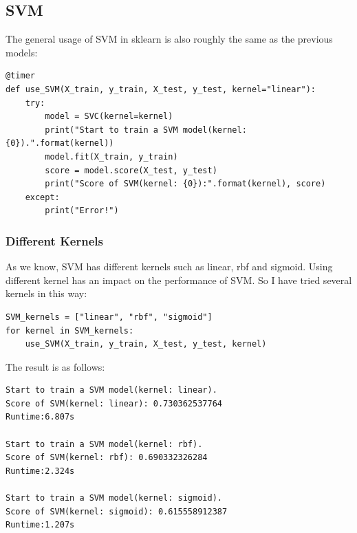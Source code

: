 \documentclass[a4paper]{article}
\begin{document}
        \subsection{SVM}
The general usage of SVM in sklearn is also roughly the same as the previous models:
\begin{verbatim}
@timer
def use_SVM(X_train, y_train, X_test, y_test, kernel="linear"):
    try:
        model = SVC(kernel=kernel)
        print("Start to train a SVM model(kernel: {0}).".format(kernel))
        model.fit(X_train, y_train)
        score = model.score(X_test, y_test)
        print("Score of SVM(kernel: {0}):".format(kernel), score)
    except:
        print("Error!")
\end{verbatim}
            \subsubsection{Different Kernels}
As we know, SVM has different kernels such as linear, rbf and sigmoid. Using different kernel has an impact on the performance of SVM. So I have tried several kernels in this way:
\begin{verbatim}
SVM_kernels = ["linear", "rbf", "sigmoid"]
for kernel in SVM_kernels:
    use_SVM(X_train, y_train, X_test, y_test, kernel)
\end{verbatim}
The result is as follows:
\begin{verbatim}
Start to train a SVM model(kernel: linear).
Score of SVM(kernel: linear): 0.730362537764
Runtime:6.807s

Start to train a SVM model(kernel: rbf).
Score of SVM(kernel: rbf): 0.690332326284
Runtime:2.324s

Start to train a SVM model(kernel: sigmoid).
Score of SVM(kernel: sigmoid): 0.615558912387
Runtime:1.207s
\end{verbatim}
\end{document}
